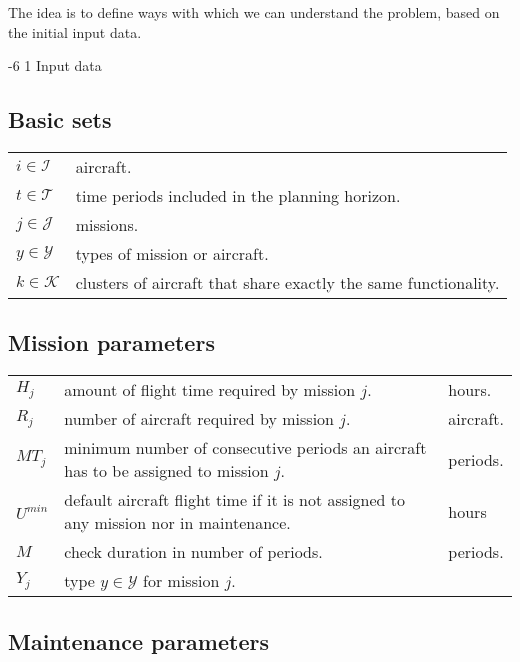\documentclass[a4paper,onecolumn,fleqn]{article}
\makeatletter
\renewcommand\section{\@startsection{section}{1}{\z@}%
                       {-6\p@ \@plus -0\p@ \@minus -0\p@}%
                       {2\p@ \@plus 0\p@ \@minus 0\p@}%
                       {\normalsize\textbf}}
\renewcommand\section{\@startsection{section}{2}{\z@}%
                       {-6\p@ \@plus -0\p@ \@minus -0\p@}%
                       {2\p@ \@plus 0\p@ \@minus 0\p@}%
                       {\normalsize\textbf}}
\renewcommand\section{\@startsection{section}{3}{\z@}%
                       {-6\p@ \@plus -0\p@ \@minus -0\p@}%
                       {1\p@ \@plus 0\p@ \@minus 0\p@}%
                       {\normalsize\itshape\bfseries}}
\makeatother
\begin{document}
The idea is to define ways with which we can understand the problem, based on the initial input data.

\section{Input data}
    \subsection{Basic sets}

        \begin{tabular}{p{15mm}p{140mm}}
            $i \in \mathcal{I}$     &  aircraft. \\
            $t \in \mathcal{T}$     &  time periods included in the planning horizon. \\
            $j \in \mathcal{J}$     &  missions. \\
            $y \in \mathcal{Y}$     &  types of mission or aircraft. \\
            $k \in \mathcal{K}$     &  clusters of aircraft that share exactly the same functionality. \\
        \end{tabular}

    \subsection{Mission parameters}

        \begin{tabular}{p{15mm}p{125mm}p{15mm}}
            $H_j$             & amount of flight time required by mission $j$. & hours. \\
            $R_j$             & number of aircraft required by mission $j$. & aircraft. \\
            $MT_j$            & minimum number of consecutive periods an aircraft has to be assigned to mission $j$. & periods. \\
            $U^{min}$         & default aircraft flight time if it is not assigned to any mission nor in maintenance.& hours \\
            $M$               & check duration in number of periods. & periods. \\
            $Y_j$             & type $y \in \mathcal{Y}$ for mission $j$. \\
        \end{tabular}

    \subsection{Maintenance parameters}
\end{document}
